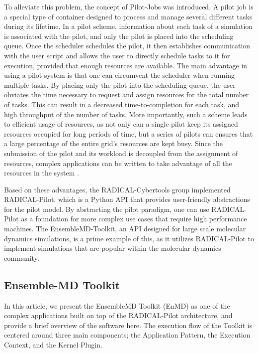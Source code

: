 \documentclass[]{article}
\begin{document}
	To alleviate this problem, the concept of Pilot-Jobs was introduced. A pilot job is a special type of container designed to process and manage several different tasks during its lifetime. In a pilot scheme, information about each task of a simulation is associated with the pilot, and only the pilot is placed into the scheduling queue. Once the scheduler schedules the pilot, it then establishes communication with the user script and allows the user to directly schedule tasks to it for execution, provided that enough resources are available. The main advantage in using a pilot system is that one can circumvent the scheduler when running multiple tasks. By placing only the pilot into the scheduling queue, the user obviates the time necessary to request and assign resources for the total number of tasks. This can result in a decreased time-to-completion for each task, and high throughput of the number of tasks. More importantly, such a scheme leads to efficient usage of resources, as not only can a single pilot keep its assigned resources occupied for long periods of time, but a series of pilots can ensures that a large percentage of the entire grid's resources are kept busy. Since the submission of the pilot and its workload is decoupled from the assignment of resources, complex applications can be written to take advantage of all the resources in the system \cite{rp_paper}.

	Based on these advantages, the RADICAL-Cybertools group implemented RADICAL-Pilot, which is a Python API that provides user-friendly abstractions for the pilot model. By abstracting the pilot paradigm, one can use RADICAL-Pilot as a foundation for more complex use cases that require high performance machines. The EnsembleMD-Toolkit, an API designed for large scale molecular dynamics simulations, is a prime example of this, as it utilizes RADICAL-Pilot to implement simulations that are popular within the molecular dynamics community.

		\subsection{Ensemble-MD Toolkit} 
			In this article, we present the EnsembleMD Toolkit (EnMD) as one of the complex applications built on top of the RADICAL-Pilot architecture, and provide a brief overview of the software here. The execution flow of the Toolkit is centered around three main components; the Application Pattern, the Execution Context, and the Kernel Plugin. 
\end{document}
